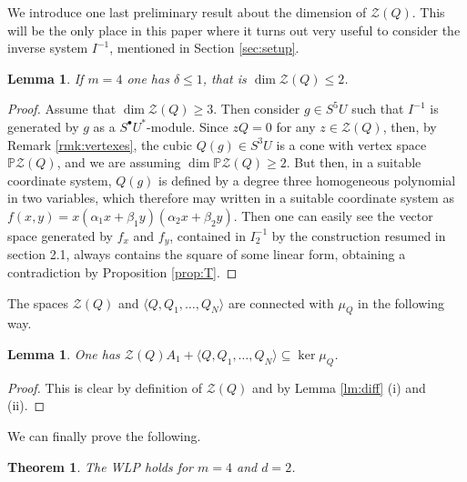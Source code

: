 \documentclass[10pt, a4paper]{amsart}
\theoremstyle{plain}
\newtheorem{thm}{Theorem}
\newtheorem{lm}[prop]{Lemma}
\theoremstyle{definition}
\theoremstyle{remark}
\def\PP{\mathbb{P}}
\begin{document}
 We introduce one last preliminary result about the dimension of $\mathcal{Z}(Q)$.  This will be the only place in this paper where it turns out very useful to consider the inverse system $I^{-1}$, mentioned in Section \ref{sec:setup}.

  \begin{lm}\label{lm:ZQbound}
 If $m=4$  one has $\delta\leq 1$, that is $\dim \mathcal{Z}(Q)\leq 2$. \end{lm}
\begin{proof} Assume that $\dim \mathcal{Z}(Q)\geq 3$. Then consider $g\in S^5U$ such that $I^{-1}$ is generated by $g$ as a $S^\bullet U^\ast$-module.  Since $zQ=0$ for any $z\in\mathcal{Z}(Q)$, then, by Remark \ref{rmk:vertexes}, the cubic $Q(g)\in S^3U$ is a cone with vertex space $\PP\mathcal{Z}(Q)$, and we are assuming $\dim\PP\mathcal{Z}(Q)\geq 2$. 
But then, in a suitable coordinate system, $Q(g)$ is defined by a degree three homogeneous polynomial in two variables, which therefore may written in a suitable coordinate system as $f(x,y)=x(\alpha_1x+\beta_1y)(\alpha_2x+\beta_2y)$. Then one can easily see the vector space generated by $f_x$ and $f_y$, contained in $I^{-1}_2$ by the construction resumed  in section 2.1, always contains the square of some linear form, obtaining a contradiction by Proposition \ref{prop:T}.
\end{proof}
 The spaces $\mathcal{Z}(Q)$ and $\langle Q, Q_1,\ldots,Q_N\rangle$ are connected with $\mu_Q$ in the following way.
 \begin{lm}\label{lm:kermuQ} One has $\mathcal{Z}(Q)A_1+\langle Q, Q_1,\ldots,Q_N\rangle\subseteq \ker\mu_Q$.
 \end{lm}
 \begin{proof} This is clear by definition of $\mathcal{Z}(Q)$ and by Lemma \ref{lm:diff} (i) and (ii).
 \end{proof}
We can finally prove the following.
\begin{thm}\label{thm:WLPm=4} The WLP holds for $m=4$ and $d=2$.
\end{thm} 
\end{document}

